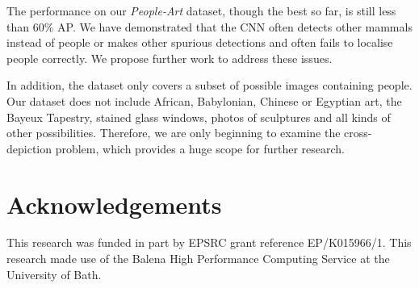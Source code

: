 \documentclass[runningheads]{llncs}
\begin{document}
The performance on our \textit{People-Art} dataset, though the best so far, is still less than 60\% \ac{AP}.
We have demonstrated that the \ac{CNN} often detects other mammals instead of people or makes other spurious detections and often fails to localise people correctly.
We propose further work to address these issues.

In addition, the dataset only covers a subset of possible images containing people.
Our dataset does not include African, Babylonian, Chinese or Egyptian art, the Bayeux Tapestry, stained glass windows, photos of sculptures and all kinds of other possibilities.
Therefore, we are only beginning to examine the cross-depiction problem, which provides a huge scope for further research.
 
\section*{Acknowledgements}
This research was funded in part by EPSRC grant reference EP/K015966/1.
This research made use of the Balena High Performance Computing Service at the University of Bath.









\end{document}
